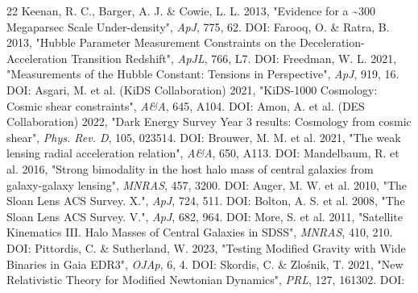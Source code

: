 \documentclass[11pt,a4paper]{article}
\begin{document}
{\begin{thebibliography}{22}
 Keenan, R. C., Barger, A. J. \& Cowie, L. L. 2013, "Evidence for a \~{}300 Megaparsec Scale Under-density", \emph{ApJ}, 775, 62. DOI: \href{https://doi.org/10.1088/0004-637X/775/1/62}{{\small\protect{}}}
 Farooq, O. \& Ratra, B. 2013, "Hubble Parameter Measurement Constraints on the Deceleration-Acceleration Transition Redshift", \emph{ApJL}, 766, L7. DOI: \href{https://doi.org/10.1088/2041-8205/766/1/L7}{{\small\protect{}}}
 Freedman, W. L. 2021, "Measurements of the Hubble Constant: Tensions in Perspective", \emph{ApJ}, 919, 16. DOI: \href{https://doi.org/10.3847/1538-4357/ac0e95}{{\small\protect{}}}
 Asgari, M. et al. (KiDS Collaboration) 2021, "KiDS-1000 Cosmology: Cosmic shear constraints", \emph{A\&A}, 645, A104. DOI: \href{https://doi.org/10.1051/0004-6361/202039070}{{\small\protect{}}}
 Amon, A. et al. (DES Collaboration) 2022, "Dark Energy Survey Year 3 results: Cosmology from cosmic shear", \emph{Phys. Rev. D}, 105, 023514. DOI: \href{https://doi.org/10.1103/PhysRevD.105.023514}{{\small\protect{}}}
 Brouwer, M. M. et al. 2021, "The weak lensing radial acceleration relation", \emph{A\&A}, 650, A113. DOI: \href{https://doi.org/10.1051/0004-6361/202040108}{{\small\protect{}}}
 Mandelbaum, R. et al. 2016, "Strong bimodality in the host halo mass of central galaxies from galaxy-galaxy lensing", \emph{MNRAS}, 457, 3200. DOI: \href{https://doi.org/10.1093/mnras/stw188}{{\small\protect{}}}
 Auger, M. W. et al. 2010, "The Sloan Lens ACS Survey. X.", \emph{ApJ}, 724, 511. DOI: \href{https://doi.org/10.1088/0004-637X/724/1/511}{{\small\protect{}}}
 Bolton, A. S. et al. 2008, "The Sloan Lens ACS Survey. V.", \emph{ApJ}, 682, 964. DOI: \href{https://doi.org/10.1086/589327}{{\small\protect{}}}
 More, S. et al. 2011, "Satellite Kinematics III. Halo Masses of Central Galaxies in SDSS", \emph{MNRAS}, 410, 210. DOI: \href{https://doi.org/10.1111/j.1365-2966.2010.17436.x}{{\small\protect{}}}
 Pittordis, C. \& Sutherland, W. 2023, "Testing Modified Gravity with Wide Binaries in Gaia EDR3", \emph{OJAp}, 6, 4. DOI: \href{https://doi.org/10.21105/astro.2205.02846}{{\small\protect{}}}
 Skordis, C. \& Zlo\'snik, T. 2021, "New Relativistic Theory for Modified Newtonian Dynamics", \emph{PRL}, 127, 161302. DOI: \href{https://doi.org/10.1103/PhysRevLett.127.161302}{{\small\protect{}}}
\end{thebibliography}
}
\end{document}
